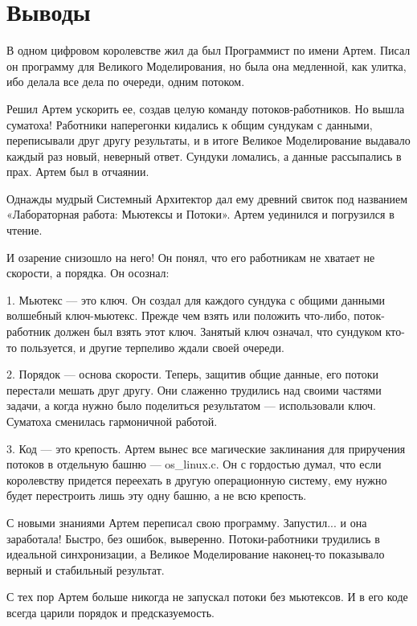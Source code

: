 
\vspace{15\baselineskip}
\section{Выводы}

В одном цифровом королевстве жил да был Программист по имени Артем. Писал он программу для Великого Моделирования, но была она медленной, как улитка, ибо делала все дела по очереди, одним потоком.

Решил Артем ускорить ее, создав целую команду потоков-работников. Но вышла суматоха! Работники наперегонки кидались к общим сундукам с данными, переписывали друг другу результаты, и в итоге Великое Моделирование выдавало каждый раз новый, неверный ответ. Сундуки ломались, а данные рассыпались в прах. Артем был в отчаянии.

Однажды мудрый Системный Архитектор дал ему древний свиток под названием «Лабораторная работа: Мьютексы и Потоки». Артем уединился и погрузился в чтение.

И озарение снизошло на него! Он понял, что его работникам не хватает не скорости, а порядка. Он осознал:

1.  Мьютекс — это ключ. Он создал для каждого сундука с общими данными волшебный ключ-мьютекс. Прежде чем взять или положить что-либо, поток-работник должен был взять этот ключ. Занятый ключ означал, что сундуком кто-то пользуется, и другие терпеливо ждали своей очереди.

2.  Порядок — основа скорости. Теперь, защитив общие данные, его потоки перестали мешать друг другу. Они слаженно трудились над своими частями задачи, а когда нужно было поделиться результатом — использовали ключ. Суматоха сменилась гармоничной работой.

3.  Код — это крепость. Артем вынес все магические заклинания для приручения потоков в отдельную башню — os\_linux.c. Он с гордостью думал, что если королевству придется переехать в другую операционную систему, ему нужно будет перестроить лишь эту одну башню, а не всю крепость.

С новыми знаниями Артем переписал свою программу. Запустил... и она заработала! Быстро, без ошибок, выверенно. Потоки-работники трудились в идеальной синхронизации, а Великое Моделирование наконец-то показывало верный и стабильный результат.

С тех пор Артем больше никогда не запускал потоки без мьютексов. И в его коде всегда царили порядок и предсказуемость.
\pagebreak
